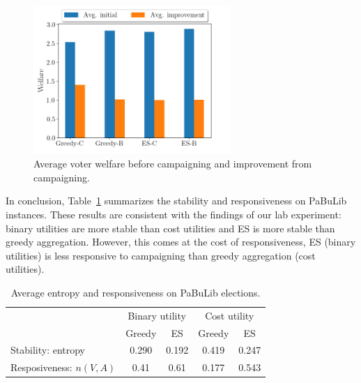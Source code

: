 \documentclass[mnsc,blindrev]{informs3_freeuse} %
\newcommand{\kibitz}[2]{\ifnum\Comments=1{\color{#1}{#2}}\fi}
\newcommand{\gb}[1]{\kibitz{red}{[GB:#1]}}
\newcommand{\mes}{ES}
\newcommand{\pabu}{PaBuLib}
\begin{document}
\begin{figure}[!h]
\begin{center}
\includegraphics[width=7.5cm]{../experiment/welfare_improvement.png}
\caption{Average voter welfare before campaigning and improvement from campaigning. 
}\label{fig:wel_improve}
\end{center}
\vspace{-3mm}
\end{figure}

In conclusion, Table~\ref{tab:pabu_ent_resp} summarizes the stability and responsiveness on \pabu{} instances. These results are consistent  with the findings of our lab experiment: binary utilities are more stable than cost utilities and \mes{} is more stable than greedy aggregation. \gb{the way es beats greedy is not the same as the way binary beats cost.}
However, this comes at the cost of responsiveness, \mes{} (binary utilities) is less responsive to campaigning than greedy aggregation (cost utilities). 

\begin{table}[htb]
    \centering
    \caption{Average entropy and responsiveness on \pabu{} elections. }
    \begin{tabular}{lcccc}
         \toprule
         &\multicolumn{2}{c}{Binary utility}& \multicolumn{2}{c}{Cost utility}  \\  \cmidrule(lr){2-3}\cmidrule(lr){4-5}
         & Greedy & \mes{} & Greedy & \mes{} \\
         \midrule
          Stability: entropy & 0.290 & 0.192 & 0.419 & 0.247 \\  
          Resposiveness: $n(V, A)$ & 0.41  & 0.61    &  0.177 &  0.543 \\
         \bottomrule
    \end{tabular}
    \label{tab:pabu_ent_resp}
\end{table}
\end{document}
